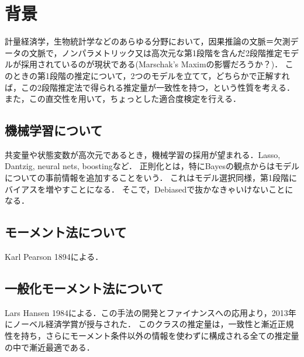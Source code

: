 \documentclass[uplatex,dvipdfmx]{jsreport}
\begin{document}
\section{背景}

\begin{tcolorbox}[colframe=ForestGreen, colback=ForestGreen!10!white,breakable,colbacktitle=ForestGreen!40!white,coltitle=black,fonttitle=\bfseries\sffamily,
title=]
    計量経済学，生物統計学などのあらゆる分野において，因果推論の文脈＝欠測データの文脈で，ノンパラメトリック又は高次元な第1段階を含んだ2段階推定モデルが採用されているのが現状である(Marschak's Maximの影響だろうか？)．
    このときの第1段階の推定について，2つのモデルを立てて，どちらかで正解すれば，この2段階推定法で得られる推定量が一致性を持つ，という性質を考える．
    また，この直交性を用いて，ちょっとした適合度検定を行える．
\end{tcolorbox}

\subsection{機械学習について}

共変量や状態変数が高次元であるとき，機械学習の採用が望まれる．Lasso, Dantzig, neural nets, boostingなど．
正則化とは，特にBayesの観点からはモデルについての事前情報を追加することをいう．
これはモデル選択同様，第1段階にバイアスを増やすことになる．
そこで，Debiasedで抜かなきゃいけないことになる．

\subsection{モーメント法について}

\begin{tcolorbox}[colframe=ForestGreen, colback=ForestGreen!10!white,breakable,colbacktitle=ForestGreen!40!white,coltitle=black,fonttitle=\bfseries\sffamily,
title=]
    Karl Pearson 1894による．
\end{tcolorbox}

\subsection{一般化モーメント法について}

\begin{tcolorbox}[colframe=ForestGreen, colback=ForestGreen!10!white,breakable,colbacktitle=ForestGreen!40!white,coltitle=black,fonttitle=\bfseries\sffamily,
title=Generalized Method of Moments]
    Lars Hansen 1984による．この手法の開発とファイナンスへの応用より，2013年にノーベル経済学賞が授与された．
    このクラスの推定量は，一致性と漸近正規性を持ち，さらにモーメント条件以外の情報を使わずに構成される全ての推定量の中で漸近最適である．
\end{tcolorbox}
\end{document}
